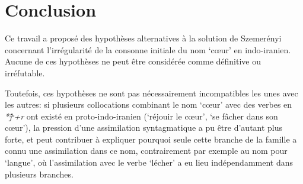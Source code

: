 \documentclass{article}
\newcommand{\ipa}[1]{{\phon\textit{#1}}}
\begin{document}
\section*{Conclusion}
Ce travail a proposé des hypothèses alternatives à la solution de Szemerényi concernant l'irrégularité de la consonne initiale du nom `cœur' en indo-iranien. Aucune de ces hypothèses ne peut être considérée comme définitive ou irréfutable. 

Toutefois, ces hypothèses ne sont pas nécessairement incompatibles les unes avec les autres: si plusieurs collocations combinant le nom `cœur' avec des verbes en \ipa{*j́ʰ+r} ont existé en proto-indo-iranien (`réjouir le cœur', `se fâcher dans son cœur'), la pression d'une assimilation syntagmatique a pu être d'autant plus forte, et peut contribuer à expliquer pourquoi seule cette branche de la famille a connu une assimilation dans ce nom, contrairement par exemple au nom pour `langue', où l'assimilation avec le verbe `lécher' a eu lieu indépendamment dans plusieurs branches.




\end{document}
